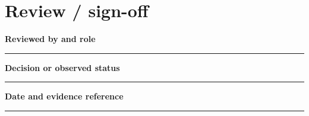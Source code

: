 \documentclass[11pt,letterpaper]{article}
\begin{document}
\section{Review / sign-off}
\noindent\textbf{Reviewed by and role}\par
\vspace{1.1em}\noindent\rule{0.96\linewidth}{0.4pt}\par\vspace{0.5em}
\noindent\textbf{Decision or observed status}\par
\vspace{1.1em}\noindent\rule{0.96\linewidth}{0.4pt}\par\vspace{0.5em}
\noindent\textbf{Date and evidence reference}\par
\vspace{1.1em}\noindent\rule{0.96\linewidth}{0.4pt}\par\vspace{0.5em}
\end{document}
